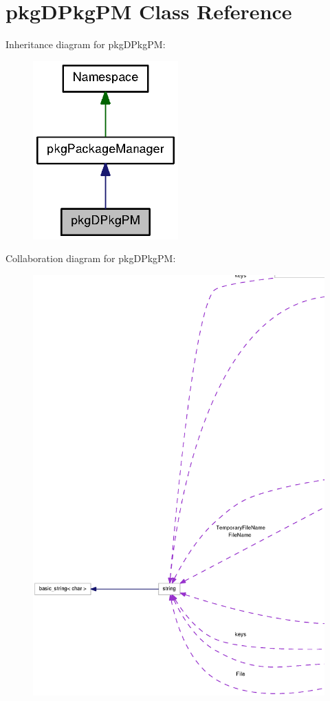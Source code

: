\section{pkg\-D\-Pkg\-P\-M \-Class \-Reference}
\label{classpkgDPkgPM}


\-Inheritance diagram for pkg\-D\-Pkg\-P\-M\-:
\nopagebreak
\begin{figure}[H]
\begin{center}
\leavevmode
\includegraphics[width=158pt]{classpkgDPkgPM__inherit__graph}
\end{center}
\end{figure}


\-Collaboration diagram for pkg\-D\-Pkg\-P\-M\-:
\nopagebreak
\begin{figure}[H]
\begin{center}
\leavevmode
\includegraphics[width=350pt]{classpkgDPkgPM__coll__graph}
\end{center}
\end{figure}
